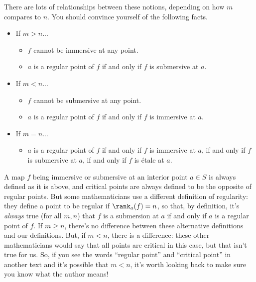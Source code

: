 There are lots of relationships between these notions, depending on how $m$ compares to $n$. You should convince yourself of the following facts.  
\begin{itemize}
	\item If $m > n$...
	\begin{itemize}
		\item $f$ cannot be immersive at any point.
		\item $a$ is a regular point of $f$ if and only if $f$ is submersive at $a$.
	\end{itemize}
	\item If $m < n$...
	\begin{itemize}
		\item $f$ cannot be submersive at any point.
		\item $a$ is a regular point of $f$ if and only if $f$ is immersive at $a$.
	\end{itemize}
	\item If $m = n$...
	\begin{itemize}
		\item $a$ is a regular point of $f$ if and only if $f$ is immersive at $a$, if and only if $f$ is submersive at $a$, if and only if $f$ is \'etale at $a$. 
	\end{itemize}
\end{itemize}

\begin{caution}
	A map $f$ being immersive or submersive at an interior point $a \in S$ is always defined as it is above, and critical points are always defined to be the opposite of regular points. But some mathematicians use a different definition of regularity: they define a point to be regular if $\rank_a(f) = n$, so that, by definition, it's \emph{always} true (for all $m, n$) that $f$ is a submersion at $a$ if and only if $a$ is a regular point of $f$. If $m \geq n$, there's no difference between these alternative definitions and our definitions. But, if $m < n$, there is a difference: these other mathematicians would say that all points are critical in this case, but that isn't true for us. So, if you see the words ``regular point'' and ``critical point'' in another text and it's possible that $m < n$, it's worth looking back to make sure you know what the author means!
\end{caution}

